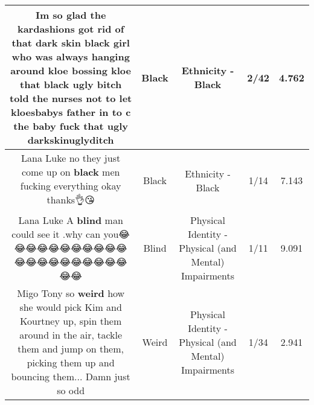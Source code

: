 \documentclass[11pt]{article}
\newlength\mylength
\begin{document}
\begin{center}
\begin{longtable}{|C{.65\mylength}|C{.30\mylength}|C{.12\mylength}|C{.12\mylength}|C{.12\mylength}|}
  \small Im so glad the kardashions got rid  of that dark skin \textbf{black} girl  who was always hanging around kloe bossing kloe that \textbf{black} ugly bitch told the nurses not to let kloesbabys father in to c the baby fuck that ugly darkskinuglyditch\normalsize   & Black & Ethnicity - Black & 2/42 & 4.762 \\  \hline
  \small Lana Luke no they just come up on \textbf{black} men fucking everything okay thanks👌😘\normalsize   & Black & Ethnicity - Black & 1/14 & 7.143 \\  \hline
  \small Lana Luke  A \textbf{blind} man could see it  .why can you😂😂😂😂😂😂😂😂😂😂😂😂😂😂😂😂😂😂😂😂😂😂😂\normalsize   & Blind & Physical Identity - Physical (and Mental) Impairments & 1/11 & 9.091 \\  \hline
  \small Migo Tony so \textbf{weird} how she would pick Kim and Kourtney up, spin them around in the air, tackle them and jump on them, picking them up and bouncing them... Damn just so  odd\normalsize   & Weird & Physical Identity - Physical (and Mental) Impairments & 1/34 & 2.941 \\  \hline

\end{longtable}
\end{center}
\end{document}
